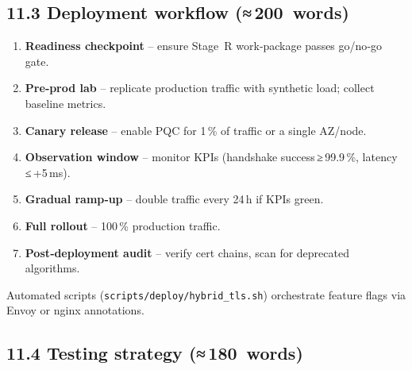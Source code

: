 \documentclass[
  english,
]{article}
\providecommand{\tightlist}{%
  \setlength{\itemsep}{0pt}\setlength{\parskip}{0pt}}
\begin{document}
\subsection{11.3 Deployment workflow
(≈\,200~words)}\label{deployment-workflow-200-words}

\begin{enumerate}
\def\labelenumi{\arabic{enumi}.}
\tightlist
\item
  \textbf{Readiness checkpoint} -- ensure Stage~R work‑package passes
  go/no‑go gate.
\item
  \textbf{Pre‑prod lab} -- replicate production traffic with synthetic
  load; collect baseline metrics.
\item
  \textbf{Canary release} -- enable PQC for 1\,\% of traffic or a single
  AZ/node.
\item
  \textbf{Observation window} -- monitor KPIs (handshake
  success\,≥\,99.9\,\%, latency ≤\,+5\,ms).
\item
  \textbf{Gradual ramp‑up} -- double traffic every 24\,h if KPIs green.
\item
  \textbf{Full rollout} -- 100\,\% production traffic.
\item
  \textbf{Post‑deployment audit} -- verify cert chains, scan for
  deprecated algorithms.
\end{enumerate}

Automated scripts (\texttt{scripts/deploy/hybrid\_tls.sh}) orchestrate
feature flags via Envoy or nginx annotations.

\subsection{11.4 Testing strategy
(≈\,180~words)}\label{testing-strategy-180-words}
\end{document}
